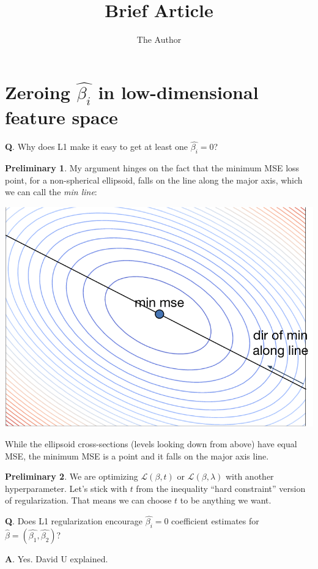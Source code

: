 \documentclass[11pt]{article}
\title{Brief Article}
\author{The Author}
\begin{document}

\section*{Zeroing $\hat{\beta_i}$ in low-dimensional feature space}

{\bf Q}. Why does L1 make it easy to get at least one $\hat{\beta_i}=0$?

{\bf Preliminary 1}. My argument hinges on the fact that the minimum MSE loss point, for a non-spherical ellipsoid, falls on the line along the major axis, which we can call the {\em min line}:

\begin{center}
\includegraphics[scale=.5]{images/min-line.png}
\end{center}

\noindent While the ellipsoid cross-sections (levels looking down from above) have equal MSE, the minimum MSE is a point and it falls on the major axis line.

{\bf Preliminary 2}. We are optimizing ${\mathscr L}(\beta, t)$ or ${\mathscr L}(\beta, \lambda)$ with another hyperparameter.  Let's stick with $t$ from the inequality ``hard constraint'' version of regularization. That means we can choose $t$ to be anything we want.

{\bf Q}. Does L1 regularization encourage $\hat{\beta_i}=0$ coefficient estimates for $\hat{\beta} = (\hat{\beta_1}, \hat{\beta_2})$?

{\bf A}. Yes. David U explained.
\end{document}
